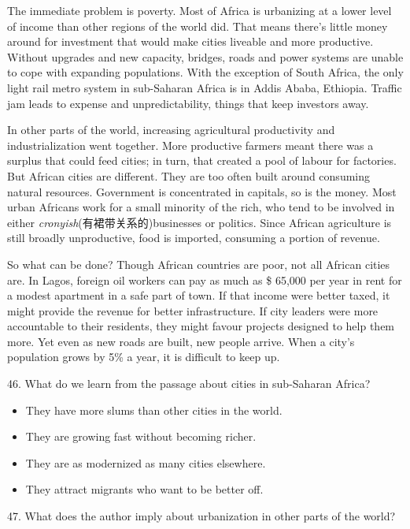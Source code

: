 \documentclass[UTF8,11pt]{ctexart}
\begin{document}
The immediate problem is poverty. Most of Africa is urbanizing at a lower level of income than other regions of the world did. That means there’s little money around for investment that would make cities liveable and more productive. Without upgrades and new capacity, bridges, roads and power systems are unable to cope with expanding populations. With the exception of South Africa, the only light rail metro system in sub-Saharan Africa is in Addis Ababa, Ethiopia. Traffic jam leads to expense and unpredictability, things that keep investors away.


In other parts of the world, increasing agricultural productivity and industrialization went together. More productive farmers meant there was a surplus that could feed cities; in turn, that created a pool of labour for factories. But African cities are different. They are too often built around consuming natural resources. Government is concentrated in capitals, so is the money. Most urban Africans work for a small minority of the rich, who tend to be involved in either\textit{ cronyish}(有裙带关系的)businesses or politics. Since African agriculture is still broadly unproductive, food is imported, consuming a portion of revenue.


So what can be done? Though African countries are poor, not all African cities are. In Lagos, foreign oil workers can pay as much as \$ 65,000 per year in rent for a modest apartment in a safe part of town. If that income were better taxed, it might provide the revenue for better infrastructure. If city leaders were more accountable to their residents, they might favour projects designed to help them more. Yet even as new roads are built, new people arrive. When a city’s population grows by 5\% a year, it is difficult to keep up.


46. What do we learn from the passage about cities in sub-Saharan Africa?


\begin{itemize}[leftmargin=2em,itemsep=.2em,topsep=.4em]\item[A.] They have more slums than other cities in the world.
\item[B.] They are growing fast without becoming richer.
\item[C.] They are as modernized as many cities elsewhere.
\item[D.] They attract migrants who want to be better off.
\end{itemize}

47. What does the author imply about urbanization in other parts of the world?
\end{document}
